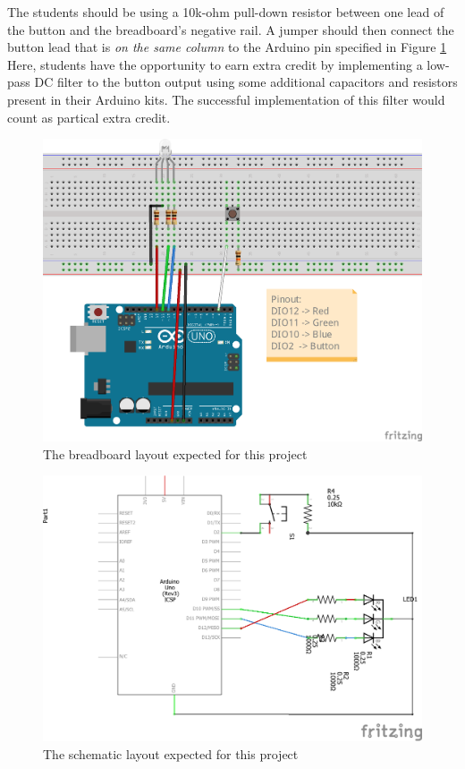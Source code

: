 \documentclass{article}
\begin{document}
    The students should be using a 10k-ohm pull-down resistor between one lead of the button and the breadboard's negative rail.
    A jumper should then connect the button lead that is \emph{on the same column} to the Arduino pin  specified in Figure \ref{fig:rgb_led_bb}
    Here, students have the opportunity to earn extra credit by implementing a low-pass DC filter to the button output using some additional capacitors and resistors present in their Arduino kits.
    The successful implementation of this filter would count as partical extra credit.

    \begin{figure}[ht!]
        \centering
        \includegraphics[]{p1_rgb_led_bb.png}
        \caption[]{The breadboard layout expected for this project}
        \label{fig:rgb_led_bb}
    \end{figure}

    \begin{figure}[ht!]
        \centering
        \includegraphics[]{p1_rgb_led_sch.png}
        \caption{The schematic layout expected for this project}
        \label{fig:rgb_led_sch}
    \end{figure}
\end{document}
